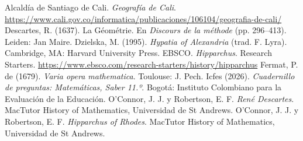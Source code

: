 \documentclass[11pt]{article}
\begin{document}
\begin{referencias}
 Alcaldía de Santiago de Cali. \emph{Geografía de Cali}.
  \url{https://www.cali.gov.co/informatica/publicaciones/106104/geografia-de-cali/}
 Descartes, R. (1637). La Géométrie. En \emph{Discours de
  la méthode} (pp. 296--413). Leiden: Jan Maire.
 Dzielska, M. (1995). \emph{Hypatia of Alexandria} (trad.
  F. Lyra). Cambridge, MA: Harvard University Press.
 EBSCO. \emph{Hipparchus}. Research Starters.
  \url{https://www.ebsco.com/research-starters/history/hipparchus}
 Fermat, P. de (1679). \emph{Varia opera mathematica}.
  Toulouse: J. Pech.
 Icfes (2026). \emph{Cuadernillo de preguntas: Matemáticas,
  Saber 11.º}. Bogotá: Instituto Colombiano para la Evaluación de la Educación.
 O'Connor, J. J. y Robertson, E. F. \emph{René
  Descartes}. MacTutor History of Mathematics, Universidad de St Andrews.
 O'Connor, J. J. y Robertson, E. F. \emph{Hipparchus
  of Rhodes}. MacTutor History of Mathematics, Universidad de St Andrews.

\end{referencias}
\end{document}

